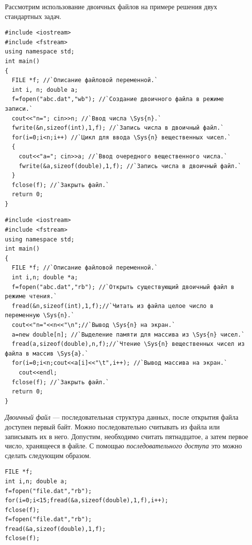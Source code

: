 Рассмотрим использование двоичных файлов на примере решения двух стандартных задач.

\begin{lstlisting}
#include <iostream>
#include <fstream>
using namespace std;
int main()
{
  FILE *f; //`Описание файловой переменной.`
  int i, n; double a;
  f=fopen("abc.dat","wb"); //`Создание двоичного файла в режиме записи.`
  cout<<"n="; cin>>n; //`Ввод числа \Sys{n}.`
  fwrite(&n,sizeof(int),1,f); //`Запись числа в двоичный файл.`
  for(i=0;i<n;i++) //`Цикл для ввода \Sys{n} вещественных чисел.`
  {
    cout<<"a="; cin>>a; //`Ввод очередного вещественного числа.`
    fwrite(&a,sizeof(double),1,f); //`Запись числа в двоичный файл.`
  }
  fclose(f); //`Закрыть файл.`
  return 0;
}
\end{lstlisting}

\begin{lstlisting}
#include <iostream>
#include <fstream>
using namespace std;
int main()
{
  FILE *f; //`Описание файловой переменной.`
  int i,n; double *a;
  f=fopen("abc.dat","rb"); //`Открыть существующий двоичный файл в режиме чтения.`
  fread(&n,sizeof(int),1,f);//`Читать из файла целое число в переменную \Sys{n}.`
  cout<<"n="<<n<<"\n";//`Вывод \Sys{n} на экран.`
  a=new double[n]; //`Выделение памяти для массива из \Sys{n} чисел.`
  fread(a,sizeof(double),n,f);//`Чтение \Sys{n} вещественных чисел из файла в массив \Sys{a}.`
  for(i=0;i<n;cout<<a[i]<<"\t",i++); //`Вывод массива на экран.`
    cout<<endl;
  fclose(f); //`Закрыть файл.`
  return 0;
}
\end{lstlisting}

\emph{Двоичный файл }--- последовательная структура данных, после открытия файла доступен первый байт. Можно
последовательно считывать из файла или записывать их в него. Допустим, необходимо считать пятнадцатое, а затем первое
число, хранящееся в файле. С помощью \emph{последовательного доступа}
это можно сделать следующим образом.
\begin{lstlisting}
FILE *f; 
int i,n; double a;
f=fopen("file.dat","rb");
for(i=0;i<15;fread(&a,sizeof(double),1,f),i++);
fclose(f);
f=fopen("file.dat","rb");
fread(&a,sizeof(double),1,f);
fclose(f);
\end{lstlisting}


